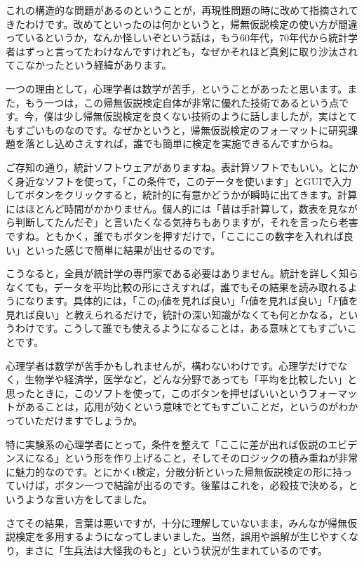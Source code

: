 \documentclass{ltjsbook}
\begin{document}
これの構造的な問題があるのということが，再現性問題の時に改めて指摘されてきたわけです。改めてといったのは何かというと，帰無仮説検定の使い方が間違っているというか，なんか怪しいぞという話は，もう60年代，70年代から統計学者はずっと言ってたわけなんですけれども，なぜかそれほど真剣に取り沙汰されてこなかったという経緯があります。

一つの理由として，心理学者は数学が苦手，ということがあったと思います。また，もう一つは，この帰無仮説検定自体が非常に優れた技術であるという点です。今，僕は少し帰無仮説検定を良くない技術のように話しましたが，実はとてもすごいものなのです。なぜかというと，帰無仮説検定のフォーマットに研究課題を落とし込めさえすれば，誰でも簡単に検定を実施できるんですからね。

ご存知の通り，統計ソフトウェアがありますね。表計算ソフトでもいい。とにかく身近なソフトを使って，「この条件で，このデータを使います」とGUIで入力してボタンをクリックすると，統計的に有意かどうかが瞬時に出てきます。計算にはほとんど時間がかかりません。個人的には「昔は手計算して，数表を見ながら判断してたんだぞ」と言いたくなる気持ちもありますが，それを言ったら老害ですね。ともかく，誰でもボタンを押すだけで，「ここにこの数字を入れれば良い」といった感じで簡単に結果が出せるのです。

こうなると，全員が統計学の専門家である必要はありません。統計を詳しく知らなくても，データを平均比較の形にさえすれば，誰でもその結果を読み取れるようになります。具体的には，「この$p$値を見れば良い」「$t$値を見れば良い」「$F$値を見れば良い」と教えられるだけで，統計の深い知識がなくても何とかなる，というわけです。こうして誰でも使えるようになることは，ある意味とてもすごいことです。

心理学者は数学が苦手かもしれませんが，構わないわけです。心理学だけでなく，生物学や経済学，医学など，どんな分野であっても「平均を比較したい」と思ったときに，このソフトを使って，このボタンを押せばいいというフォーマットがあることは，応用が効くという意味でとてもすごいことだ，というのがわかっていただけますでしょうか。

特に実験系の心理学者にとって，条件を整えて「ここに差が出れば仮説のエビデンスになる」という形を作り上げること，そしてそのロジックの積み重ねが非常に魅力的なのです。とにかくt検定，分散分析といった帰無仮説検定の形に持っていけば，ボタン一つで結論が出るのです。後輩はこれを，必殺技で決める，というような言い方をしてました。

さてその結果，言葉は悪いですが，十分に理解していないまま，みんなが帰無仮説検定を多用するようになってしまいました。当然，誤用や誤解が生じやすくなり，まさに「生兵法は大怪我のもと」という状況が生まれているのです。
\end{document}
